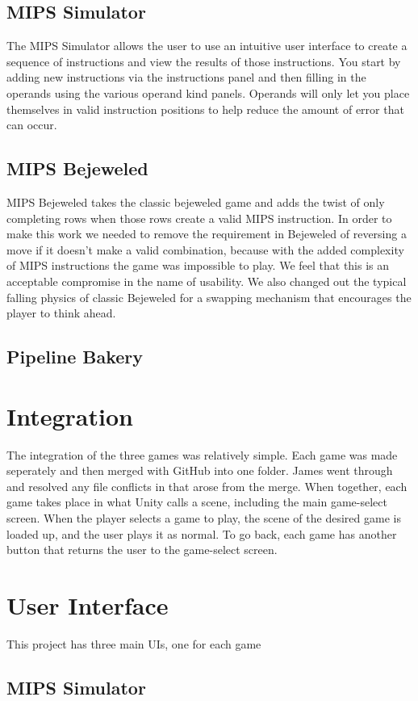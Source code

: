 \documentclass[12pt]{article}
\begin{document}
	\subsection{MIPS Simulator}
	The MIPS Simulator allows the user to use an intuitive user interface to create a sequence of instructions and view the results of those instructions. You start by adding new instructions via the instructions panel and then filling in the operands using the various operand kind panels. Operands will only let you place themselves in valid instruction positions to help reduce the amount of error that can occur.
	\subsection{MIPS Bejeweled}
	MIPS Bejeweled takes the classic bejeweled game and adds the twist of only completing rows when those rows create a valid MIPS instruction. In order to make this work we needed to remove the requirement in Bejeweled of reversing a move if it doesn't make a valid combination, because with the added complexity of MIPS instructions the game was impossible to play. We feel that this is an acceptable compromise in the name of usability. We also changed out the typical falling physics of classic Bejeweled for a swapping mechanism that encourages the player to think ahead.
	\subsection{Pipeline Bakery}
	\section{Integration}
	The integration of the three games was relatively simple. Each game was made seperately and then merged with GitHub into one folder. James went through and resolved any file conflicts in that arose from the merge. When together, each game takes place in what Unity calls a scene, including the main game-select screen. When the player selects a game to play, the scene of the desired game is loaded up, and the user plays it as normal. To go back, each game has another button that returns the user to the game-select screen.
	\section{User Interface}
	This project has three main UIs, one for each game
	\subsection{MIPS Simulator}
\end{document}
